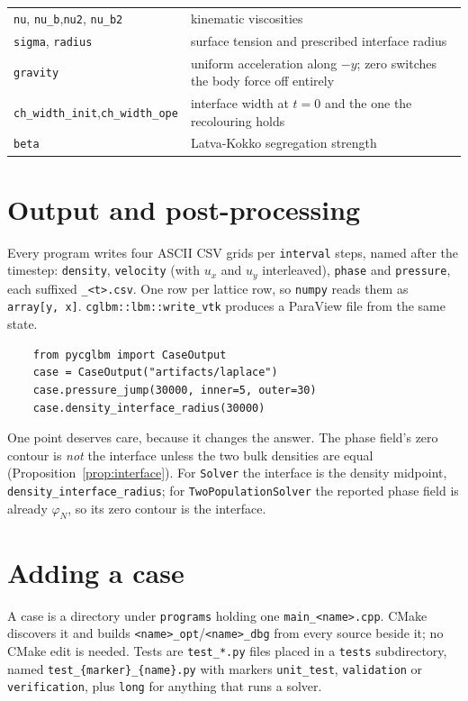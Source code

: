 \documentclass[11pt,a4paper]{article}
\theoremstyle{plain}
\theoremstyle{definition}
\begin{document}
\begin{center}
\begin{tabular}{@{}p{5.0cm}p{9.2cm}@{}}
\texttt{nu}, \texttt{nu\_b},\newline \texttt{nu2}, \texttt{nu\_b2} & kinematic viscosities \\
\texttt{sigma}, \texttt{radius} & surface tension and prescribed interface radius \\
\texttt{gravity}             & uniform acceleration along $-y$; zero switches the body force off entirely \\
\texttt{ch\_width\_init},\newline \texttt{ch\_width\_ope} & interface width at $t=0$ and the one the recolouring holds \\
\texttt{beta}                & Latva-Kokko segregation strength \\
\bottomrule
\end{tabular}
\end{center}

\section{Output and post-processing}

Every program writes four ASCII CSV grids per \texttt{interval} steps, named
after the timestep: \texttt{density}, \texttt{velocity} (with $u_x$ and $u_y$
interleaved), \texttt{phase} and \texttt{pressure}, each suffixed
\texttt{\_<t>.csv}. One row per lattice row, so \texttt{numpy} reads
them as \texttt{array[y, x]}. \texttt{cglbm::lbm::write\_vtk} produces a
ParaView file from the same state.

\begin{verbatim}
    from pycglbm import CaseOutput
    case = CaseOutput("artifacts/laplace")
    case.pressure_jump(30000, inner=5, outer=30)
    case.density_interface_radius(30000)
\end{verbatim}

One point deserves care, because it changes the answer. The phase field's zero
contour is \emph{not} the interface unless the two bulk densities are equal
(Proposition~\ref{prop:interface}). For \texttt{Solver} the interface is the
density midpoint, \texttt{density\_interface\_radius}; for
\texttt{TwoPopulationSolver} the reported phase field is already $\varphi_N$, so
its zero contour is the interface.

\section{Adding a case}

A case is a directory under \texttt{programs} holding one
\texttt{main\_<name>.cpp}. CMake discovers it and builds
\texttt{<name>\_opt}/\texttt{<name>\_dbg} from every source beside it; no CMake
edit is needed. Tests are \texttt{test\_*.py} files placed in a \texttt{tests}
subdirectory, named \texttt{test\_\{marker\}\_\{name\}.py} with markers
\texttt{unit\_test}, \texttt{validation} or \texttt{verification}, plus
\texttt{long} for anything that runs a solver.
\end{document}
